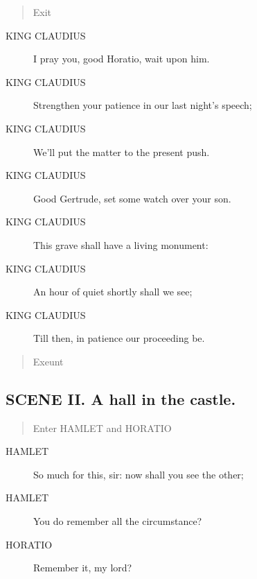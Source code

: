 \documentclass{article}
\begin{document}
\begin{quote}
Exit
\end{quote}
          
\begin{description}
            
\item[KING CLAUDIUS] I pray you, good Horatio, wait upon him.
\item[KING CLAUDIUS] Strengthen your patience in our last night's speech;
\item[KING CLAUDIUS] We'll put the matter to the present push.
\item[KING CLAUDIUS] Good Gertrude, set some watch over your son.
\item[KING CLAUDIUS] This grave shall have a living monument:
\item[KING CLAUDIUS] An hour of quiet shortly shall we see;
\item[KING CLAUDIUS] Till then, in patience our proceeding be.
\end{description}
          
\begin{quote}
Exeunt
\end{quote}
          
\subsection{SCENE II.  A hall in the castle.}
          
\begin{quote}
Enter HAMLET and HORATIO
\end{quote}
          
\begin{description}
            
\item[HAMLET] So much for this, sir: now shall you see the other;
\item[HAMLET] You do remember all the circumstance?
\end{description}
          
\begin{description}
            
\item[HORATIO] Remember it, my lord?
\end{description}
          
\end{document}
